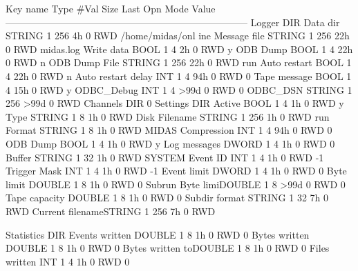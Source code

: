 \begin{DoxyCode}
Key name                        Type    #Val  Size  Last Opn Mode Value
---------------------------------------------------------------------------
Logger                          DIR
    Data dir                    STRING  1     256   4h   0   RWD  /home/midas/onl
      ine
    Message file                STRING  1     256   22h  0   RWD  midas.log
    Write data                  BOOL    1     4     2h   0   RWD  y
    ODB Dump                    BOOL    1     4     22h  0   RWD  n
    ODB Dump File               STRING  1     256   22h  0   RWD  run%
    Auto restart                BOOL    1     4     22h  0   RWD  n
    Auto restart delay          INT     1     4     94h  0   RWD  0
    Tape message                BOOL    1     4     15h  0   RWD  y
    ODBC_Debug                  INT     1     4     >99d 0   RWD  0
    ODBC_DSN                    STRING  1     256   >99d 0   RWD
    Channels                    DIR
        0 
            Settings            DIR
                Active          BOOL    1     4     1h   0   RWD  y
                Type            STRING  1     8     1h   0   RWD  Disk
                Filename        STRING  1     256   1h   0   RWD  run%
                Format          STRING  1     8     1h   0   RWD  MIDAS
                Compression     INT     1     4     94h  0   RWD  0
                ODB Dump        BOOL    1     4     1h   0   RWD  y
                Log messages    DWORD   1     4     1h   0   RWD  0
                Buffer          STRING  1     32    1h   0   RWD  SYSTEM
                Event ID        INT     1     4     1h   0   RWD  -1
                Trigger Mask    INT     1     4     1h   0   RWD  -1
                Event limit     DWORD   1     4     1h   0   RWD  0
                Byte limit      DOUBLE  1     8     1h   0   RWD  0
                Subrun Byte limiDOUBLE  1     8     >99d 0   RWD  0
                Tape capacity   DOUBLE  1     8     1h   0   RWD  0
                Subdir format   STRING  1     32    7h   0   RWD
                Current filenameSTRING  1     256   7h   0   RWD
                  
            Statistics          DIR
                Events written  DOUBLE  1     8     1h   0   RWD  0
                Bytes written   DOUBLE  1     8     1h   0   RWD  0
                Bytes written toDOUBLE  1     8     1h   0   RWD  0
                Files written   INT     1     4     1h   0   RWD  0
\end{DoxyCode}
 \par
 


